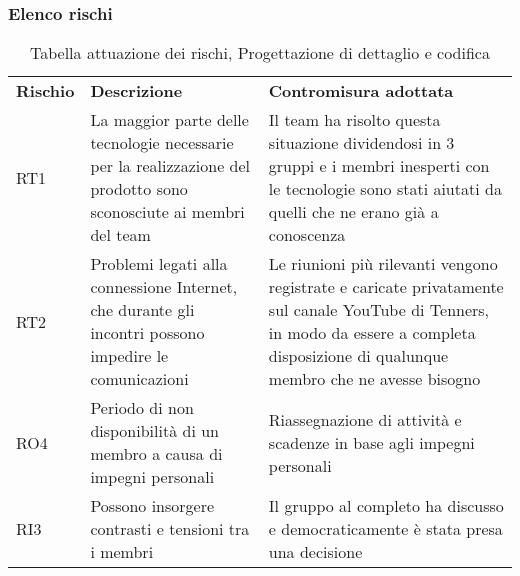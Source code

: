 \subsubsection{Elenco rischi}
\begin{table}[h]
	\caption{Tabella attuazione dei rischi, Progettazione di dettaglio e codifica}
	\begin{center}
		\begin{tabular}{p{2cm}p{6cm}p{6cm}}
			\textbf{Rischio} & \textbf{Descrizione}                                                                                                        & \textbf{Contromisura adottata}                                                                                                                                                   \\RT1 & La maggior parte delle tecnologie necessarie per la realizzazione del prodotto sono sconosciute ai membri del team & Il team ha risolto questa situazione dividendosi in 3 gruppi e i membri inesperti con le tecnologie sono stati aiutati da quelli che ne erano già a conoscenza\\
			RT2 & Problemi legati alla connessione Internet, che durante gli incontri possono impedire le comunicazioni & Le riunioni più rilevanti vengono registrate e caricate privatamente sul canale YouTube di Tenners, in modo da essere a completa disposizione di qualunque membro che ne avesse bisogno
			\\
			RO4 & Periodo di non disponibilità di un membro a causa di impegni personali & Riassegnazione di attività e scadenze in base agli impegni personali
			\\
			RI3 & Possono insorgere contrasti e tensioni tra i membri & Il gruppo al completo ha discusso e democraticamente è stata presa una decisione\\
		\end{tabular}
	\end{center}
\end{table}
